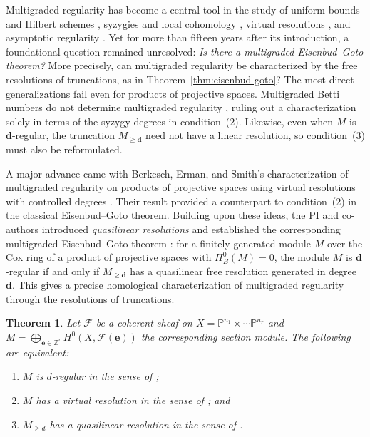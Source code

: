 \documentclass[11pt,reqno]{amsart}
\newtheorem{theorem}[lemma]{Theorem}
\theoremstyle{remark}
\newcommand{\dd}{\mathbf{d}}
\newcommand{\ee}{\mathbf{e}}
\newcommand{\PP}{\mathbb{P}}
\newcommand{\ZZ}{\mathbb{Z}}
\newcommand{\cF}{\mathcal{F}}
\begin{document}
Multigraded regularity has become a central tool in the study of uniform bounds and Hilbert schemes \cite{maclaganSmith05}, syzygies and local cohomology \cite{sidmanVanTuylWang06,botbolChardin17}, virtual resolutions \cite{BES20,bruceHellerSayrafi26}, and asymptotic regularity \cite{bruceHellerSayrafiSeceleanu25}. Yet for more than fifteen years after its introduction, a foundational question remained unresolved: \emph{Is there a multigraded Eisenbud--Goto theorem?} More precisely, can multigraded regularity be characterized by the free resolutions of truncations, as in Theorem~\ref{thm:eisenbud-goto}? The most direct generalizations fail even for products of projective spaces. Multigraded Betti numbers do not determine multigraded regularity \cite[Example~5.1]{bruceHellerSayrafi26}, ruling out a characterization solely in terms of the syzygy degrees in condition~(2). Likewise, even when $M$ is $\dd$-regular, the truncation $M_{\geq \dd}$ need not have a linear resolution, so condition~(3) must also be reformulated.

A major advance came with Berkesch, Erman, and Smith's characterization of multigraded regularity on products of projective spaces using virtual resolutions with controlled degrees \cite[Theorem~2.9]{BES20}. Their result provided a counterpart to condition~(2) in the classical Eisenbud--Goto theorem. Building upon these ideas, the PI and co-authors introduced \emph{quasilinear resolutions} and established the corresponding multigraded Eisenbud--Goto theorem \cite{bruceHellerSayrafi26}: for a finitely generated module $M$ over the Cox ring of a product of projective spaces with $H^0_B(M)=0$, the module $M$ is $\dd$-regular if and only if $M_{\geq \dd}$ has a quasilinear free resolution generated in degree $\dd$. This gives a precise homological characterization of multigraded regularity through the resolutions of truncations.

\begin{theorem}\cite[Theorem A]{bruceHellerSayrafi26}\label{thm:mgreg-main}
Let $\cF$ be a coherent sheaf on $X=\PP^{n_1}\times \cdots \PP^{n_r}$ and $M=\bigoplus_{\ee\in\ZZ^r} H^0(X,\cF(\ee))$ the corresponding section module. The following are equivalent: 
\begin{enumerate}
\item $M$ is $d$-regular in the sense of \cite{maclaganSmith04};
\item $M$ has a virtual resolution in the sense of \cite{BES20}; and
\item $M_{\geq d}$ has a quasilinear resolution in the sense of \cite{bruceHellerSayrafi26}.
\end{enumerate}
\end{theorem}
\end{document}
